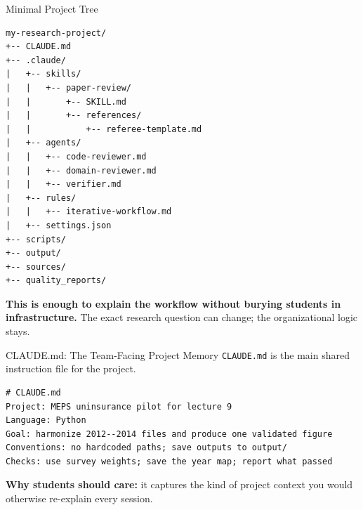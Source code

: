 \documentclass[10pt,english,aspectratio=169]{beamer}
\begin{document}
\begin{frame}[fragile]{Minimal Project Tree}
\begin{lstlisting}[style=pythonstyle,language={},basicstyle=\ttfamily\tiny]
my-research-project/
+-- CLAUDE.md
+-- .claude/
|   +-- skills/
|   |   +-- paper-review/
|   |       +-- SKILL.md
|   |       +-- references/
|   |           +-- referee-template.md
|   +-- agents/
|   |   +-- code-reviewer.md
|   |   +-- domain-reviewer.md
|   |   +-- verifier.md
|   +-- rules/
|   |   +-- iterative-workflow.md
|   +-- settings.json
+-- scripts/
+-- output/
+-- sources/
+-- quality_reports/
\end{lstlisting}

\textbf{This is enough to explain the workflow without burying students in infrastructure.} The exact research question can change; the organizational logic stays.
\end{frame}

\begin{frame}[fragile]{CLAUDE.md: The Team-Facing Project Memory}
\texttt{CLAUDE.md} is the main shared instruction file for the project.

\vspace{0.2cm}

\begin{lstlisting}[style=pythonstyle,language={},basicstyle=\ttfamily\tiny,numbers=none]
# CLAUDE.md
Project: MEPS uninsurance pilot for lecture 9
Language: Python
Goal: harmonize 2012--2014 files and produce one validated figure
Conventions: no hardcoded paths; save outputs to output/
Checks: use survey weights; save the year map; report what passed
\end{lstlisting}

\vspace{0.2cm}

\textbf{Why students should care:} it captures the kind of project context you would otherwise re-explain every session.
\end{frame}
\end{document}
